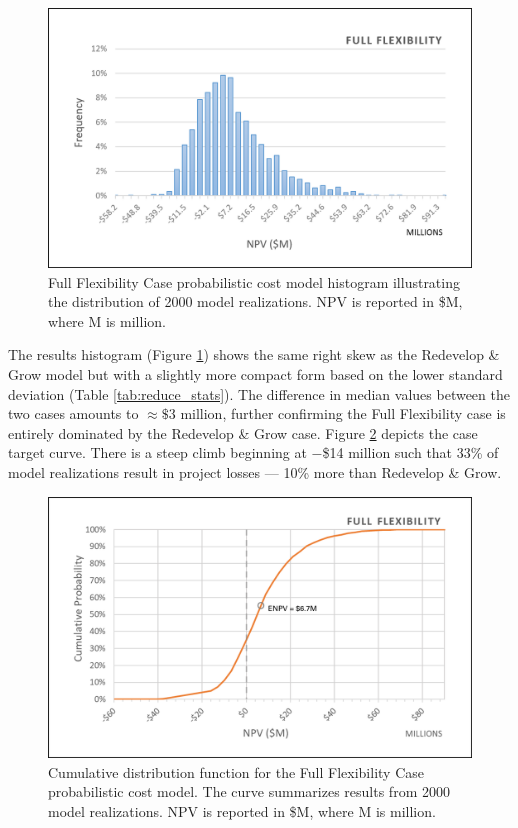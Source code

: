 \begin{figure}[!htp]
\centering
\includegraphics[width=.85\textwidth]{templates/images/Figure-Reduce_Case_Histogram.png}
\caption[Full Flexibility Case histogram]{Full Flexibility Case probabilistic cost model histogram illustrating the distribution of 2000 model realizations. NPV is reported in \$M, where M is million.}
\label{fig:reduce_case_hist}
\end{figure}

The results histogram (Figure \ref{fig:reduce_case_hist}) shows the same right skew as the Redevelop \& Grow model but with a slightly more compact form based on the lower standard deviation (Table \ref{tab:reduce_stats}). The difference in median values between the two cases amounts to $\approx\$3$ million, further confirming the Full Flexibility case is entirely dominated by the Redevelop \& Grow case. Figure \ref{fig:reduce_case_cdf} depicts the case target curve. There is a steep climb beginning at $-$\$14 million such that 33\% of model realizations result in project losses --- 10\% more than Redevelop \& Grow.

\begin{figure}[!htp]
\centering
\includegraphics[width=.85\textwidth]{templates/images/Figure-Reduce_Case_CDF.png}
\caption[Full Flexibility Case CDF]{Cumulative distribution function for the Full Flexibility Case probabilistic cost model. The curve summarizes results from 2000 model realizations. NPV is reported in \$M, where M is million.}
\label{fig:reduce_case_cdf}
\end{figure}

